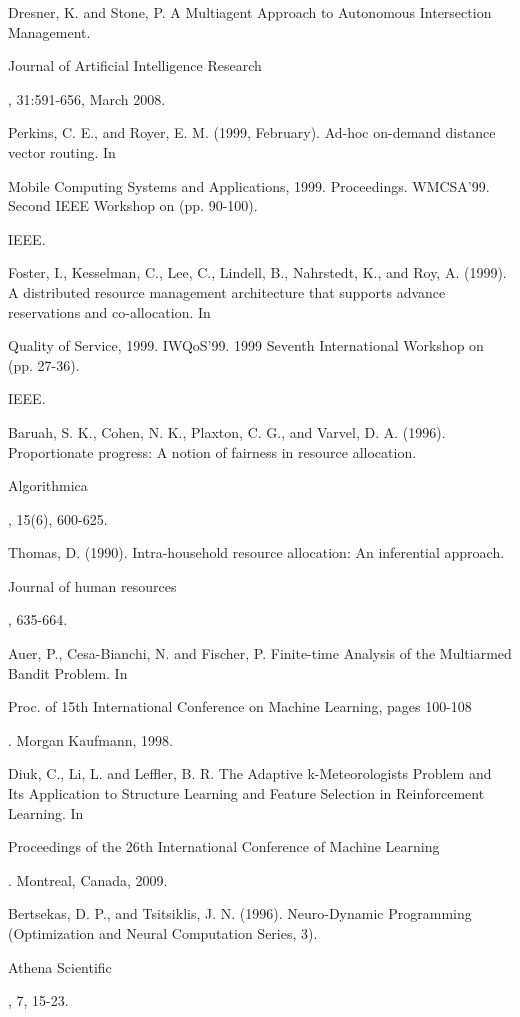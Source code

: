 \documentclass[conference]{IEEEtran}
\begin{document}
\begin{thebibliography}{1}
Dresner, K. and Stone, P. A Multiagent Approach to Autonomous Intersection Management. \begin{em}Journal of Artificial Intelligence Research\end{em}, 31:591-656, March 2008.

Perkins, C. E., and Royer, E. M. (1999, February). Ad-hoc on-demand distance vector routing. In \begin{em}Mobile Computing Systems and Applications, 1999. Proceedings. WMCSA'99. Second IEEE Workshop on (pp. 90-100).\end{em} IEEE.

Foster, I., Kesselman, C., Lee, C., Lindell, B., Nahrstedt, K., and Roy, A. (1999). A distributed resource management architecture that supports advance reservations and co-allocation. In \begin{em}Quality of Service, 1999. IWQoS'99. 1999 Seventh International Workshop on (pp. 27-36).\end{em} IEEE.

Baruah, S. K., Cohen, N. K., Plaxton, C. G., and Varvel, D. A. (1996). Proportionate progress: A notion of fairness in resource allocation. \begin{em}Algorithmica\end{em}, 15(6), 600-625.

Thomas, D. (1990). Intra-household resource allocation: An inferential approach. \begin{em}Journal of human resources\end{em}, 635-664.

Auer, P., Cesa-Bianchi, N. and Fischer, P. Finite-time Analysis of the Multiarmed Bandit Problem. In \begin{em} Proc. of 15th International Conference on Machine Learning, pages 100-108\end{em}. Morgan Kaufmann, 1998.

Diuk, C., Li, L. and Leffler, B. R. The Adaptive k-Meteorologists Problem and Its Application to Structure Learning and Feature Selection in Reinforcement Learning. In \begin{em} Proceedings of the 26th International Conference of Machine Learning\end{em}. Montreal, Canada, 2009. 

Bertsekas, D. P., and Tsitsiklis, J. N. (1996). Neuro-Dynamic Programming (Optimization and Neural Computation Series, 3). \begin{em}Athena Scientific\end{em}, 7, 15-23.

\end{thebibliography}




\end{document}
